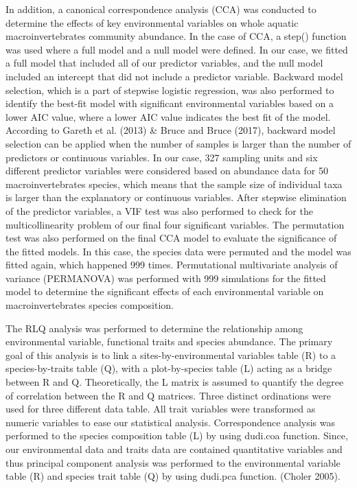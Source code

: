 \documentclass[
]{article}
\begin{document}
In addition, a canonical correspondence analysis (CCA) was conducted to
determine the effects of key environmental variables on whole aquatic
macroinvertebrates community abundance. In the case of CCA, a step()
function was used where a full model and a null model were defined. In
our case, we fitted a full model that included all of our predictor
variables, and the null model included an intercept that did not include
a predictor variable. Backward model selection, which is a part of
stepwise logistic regression, was also performed to identify the
best-fit model with significant environmental variables based on a lower
AIC value, where a lower AIC value indicates the best fit of the model.
According to Gareth et al. (2013) \& Bruce and Bruce (2017), backward
model selection can be applied when the number of samples is larger than
the number of predictors or continuous variables. In our case, 327
sampling units and six different predictor variables were considered
based on abundance data for 50 macroinvertebrates species, which means
that the sample size of individual taxa is larger than the explanatory
or continuous variables. After stepwise elimination of the predictor
variables, a VIF test was also performed to check for the
multicollinearity problem of our final four significant variables. The
permutation test was also performed on the final CCA model to evaluate
the significance of the fitted models. In this case, the species data
were permuted and the model was fitted again, which happened 999 times.
Permutational multivariate analysis of variance (PERMANOVA) was
performed with 999 simulations for the fitted model to determine the
significant effects of each environmental variable on macroinvertebrates
species composition.

The RLQ analysis was performed to determine the relationship among
environmental variable, functional traits and species abundance. The
primary goal of this analysis is to link a sites-by-environmental
variables table (R) to a species-by-traits table (Q), with a
plot-by-species table (L) acting as a bridge between R and Q.
Theoretically, the L matrix is assumed to quantify the degree of
correlation between the R and Q matrices. Three distinct ordinations
were used for three different data table. All trait variables were
transformed as numeric variables to ease our statistical analysis.
Correspondence analysis was performed to the species composition table
(L) by using dudi.coa function. Since, our environmental data and traits
data are contained quantitative variables and thus principal component
analysis was performed to the environmental variable table (R) and
species trait table (Q) by using dudi.pca function. (Choler 2005).
\end{document}
